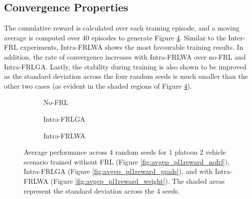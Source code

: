  \subsection{Convergence Properties}

The cumulative reward is calculated over each training episode, and a moving average is
computed over 40 episodes to generate Figure \ref{fig:intra-convergence}.  Similar to the
Inter-FRL experiments, Intra-FRLWA shows the most favourable training results.  In addition,
the rate of convergence increases with Intra-FRLWA over no-FRL and Intra-FRLGA.  Lastly,
the stability during training is also shown to be improved as the standard deviation
across the four random seeds is much smaller than the other two cases (as evident in
the shaded regions of Figure \ref{fig:intra-convergence}).
\begin{figure}[H]
\centering
    \begin{subfigure}{\interfrlRewWidth\textwidth}
        \raggedleft
        
       \caption{No-FRL}\label{fig:intra_avgep_pl1reward_nofrl}
    \end{subfigure}\hspace{\interfrlRewSpace}
    \begin{subfigure}{\interfrlRewWidth\textwidth}
        \raggedleft
        
       \caption{Intra-FRLGA}\label{fig:intra_avgep_pl1reward_grads}
    \end{subfigure}\hspace{\interfrlRewSpace}
        \begin{subfigure}{\interfrlRewWidth\textwidth}
        \raggedleft
        
       \caption{Intra-FRLWA}\label{fig:intra_avgep_pl1reward_weight}
    \end{subfigure}
\caption{Average performance across 4 random seeds for 1 platoon 2 vehicle scenario trained without FRL (Figure \ref{fig:avgep_pl1reward_nofrl}), Intra-FRLGA (Figure \ref{fig:avgep_pl1reward_grads}), and with Intra-FRLWA (Figure \ref{fig:avgep_pl1reward_weight}). The shaded areas represent the standard deviation across the 4 seeds.}
\label{fig:intra-convergence}
\end{figure}

